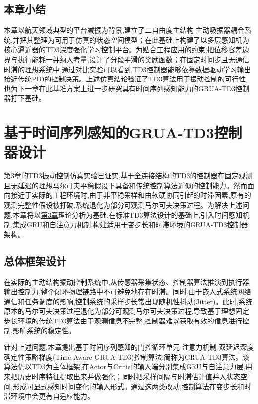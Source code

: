 \documentclass{scrbook}
\begin{document}
{{\par}\section{\label{ref-057}本章小结\label{mark-3.5}}

本章以航天领域典型的平台减振为背景,建立了二自由度主结构-主动吸振器耦合系统,并把其整理为可用于仿真的状态空间模型；在此基础上构建了以多层感知机为核心逼近器的TD3深度强化学习控制平台。为贴合工程应用的约束,把位移容差边界与执行能耗一并纳入考量,设计了分段平滑的奖励函数；在固定时间步且无通信时滞的理想系统中,通过对比实验可以看到,TD3控制器能够依靠数据驱动学习输出接近传统PID的控制决策。上述仿真结论验证了TD3算法用于振动控制的可行性,也为下一章在此基准方案上进一步研究具有时间序列感知能力的GRUA-TD3控制器打下基础。

\chapter{\label{ref-058}\newline
\label{ref-059}基于时间序列感知的GRUA-TD3控制器设计\label{mark-第4章}}

{\hyperref[ref-041]{第3章}}的TD3振动控制仿真实验已证实,基于全连接结构的TD3的控制器在固定观测且无延迟的理想马尔可夫平稳假设下具备和传统控制算法近似的控制能力。然而面向接近于实际的工程环境时,由于非平稳采样和由软硬协同引起的时滞因素,原有的观测完整性假设被打破,系统退化为部分可观测马尔可夫决策过程。为解决上述问题,本章将以{\hyperref[ref-041]{第3章}}理论分析为基础,在标准TD3算法设计的基础上,引入时间感知机制,集成GRU和自注意力机制,构建适用于变步长和时滞环境的GRUA-TD3控制器架构。

\section{\label{ref-060}总体框架设计\label{mark-4.1}}

在实际的主动结构振动控制系统中,从传感器采集状态、控制器算法推演到执行器输出控制力,整个闭环物理链路中不可避免地存在时滞。同时,由于嵌入式系统网络通信和任务调度的影响,控制系统的采样步长常出现随机性抖动(Jitter)。此时,系统原本的马尔可夫决策过程退化为部分可观测马尔可夫决策过程,导致基于理想固定步长环境的传统TD3算法由于观测信息不完整,控制器难以获取有效的信息进行控制,影响系统的稳定性。

针对上述问题,本章提出基于时间序列感知的门控循环单元-注意力机制-双延迟深度确定性策略梯度(Time-Aware GRUA-TD3)控制算法,简称为GRUA-TD3算法。该算法仍以TD3为主体框架,在Actor与Critic的输入端分别集成GRU与自注意力层,用来把历史时序特征提取出来并做强化；同时把采样间隔与时滞估计值并入状态空间,形成可显式感知时间变化的输入形式。通过这两类改动,控制算法在变步长和时滞环境中会更有自适应能力。

}
\end{document}
